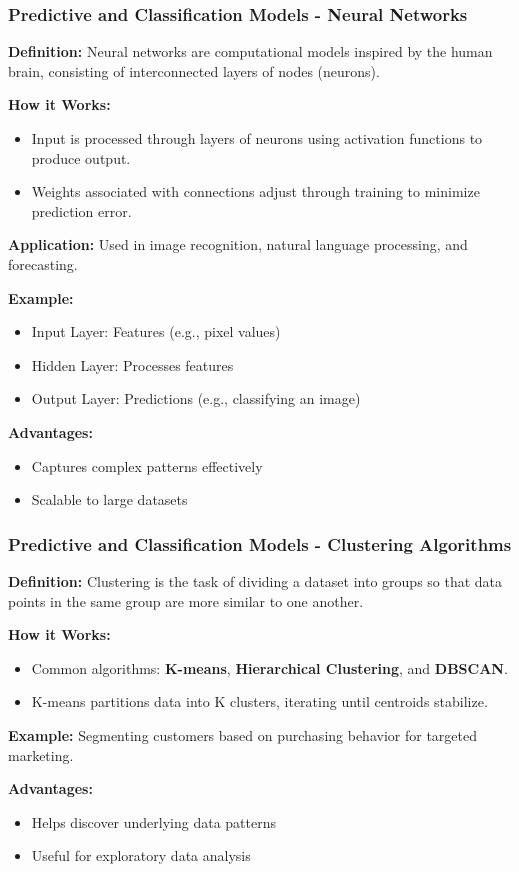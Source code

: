 \documentclass[aspectratio=169]{beamer}
\begin{document}
\begin{frame}[fragile]
    \frametitle{Predictive and Classification Models - Neural Networks}
    \textbf{Definition:} Neural networks are computational models inspired by the human brain, consisting of interconnected layers of nodes (neurons).

    \textbf{How it Works:} 
    \begin{itemize}
        \item Input is processed through layers of neurons using activation functions to produce output.
        \item Weights associated with connections adjust through training to minimize prediction error.
    \end{itemize}

    \textbf{Application:} Used in image recognition, natural language processing, and forecasting.
    
    \textbf{Example:}
    \begin{itemize}
        \item Input Layer: Features (e.g., pixel values)
        \item Hidden Layer: Processes features
        \item Output Layer: Predictions (e.g., classifying an image)
    \end{itemize}
    
    \textbf{Advantages:}
    \begin{itemize}
        \item Captures complex patterns effectively
        \item Scalable to large datasets
    \end{itemize}
\end{frame}

\begin{frame}[fragile]
    \frametitle{Predictive and Classification Models - Clustering Algorithms}
    \textbf{Definition:} Clustering is the task of dividing a dataset into groups so that data points in the same group are more similar to one another.

    \textbf{How it Works:} 
    \begin{itemize}
        \item Common algorithms: \textbf{K-means}, \textbf{Hierarchical Clustering}, and \textbf{DBSCAN}.
        \item K-means partitions data into K clusters, iterating until centroids stabilize.
    \end{itemize}

    \textbf{Example:} Segmenting customers based on purchasing behavior for targeted marketing.

    \textbf{Advantages:}
    \begin{itemize}
        \item Helps discover underlying data patterns
        \item Useful for exploratory data analysis
    \end{itemize}
\end{frame}
\end{document}
